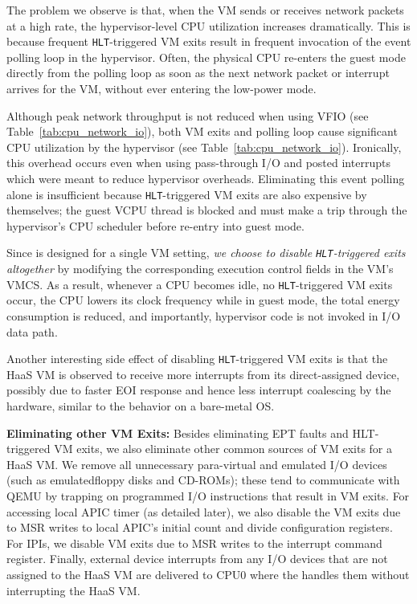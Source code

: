 The problem we observe is that, when the VM sends or receives network packets
at a high rate, the hypervisor-level CPU utilization increases
dramatically. This is because frequent {\tt HLT}-triggered VM exits
result in frequent invocation of the event polling loop in the hypervisor.
Often, the physical CPU re-enters the guest mode directly
from the polling loop as soon as the next network packet
or interrupt arrives for the VM, without ever entering the low-power mode.

Although peak network throughput is not reduced when
using VFIO (see Table~\ref{tab:cpu_network_io}),
both VM exits and polling loop cause significant
CPU utilization by the hypervisor
(see Table~\ref{tab:cpu_network_io}).
Ironically, this overhead occurs even when using pass-through I/O and
posted interrupts which were meant to reduce hypervisor overheads.
Eliminating this event polling alone is insufficient because {\tt HLT}-triggered VM exits
are also expensive by themselves; the guest VCPU thread is blocked and
must make a trip through the hypervisor's CPU scheduler before
re-entry into guest mode.

Since \na is designed for a single VM setting, {\em we choose to
disable {\tt HLT}-triggered exits altogether}
by modifying the corresponding execution control fields in the VM's VMCS.
As a result, whenever a CPU becomes idle, no {\tt HLT}-triggered
VM exits occur, the CPU lowers its clock frequency while in guest mode,
the total energy consumption is reduced, and importantly,
hypervisor code is not invoked in I/O data path.

Another interesting side effect of disabling {\tt HLT}-triggered VM exits
is that the HaaS VM is observed to receive more interrupts
from its direct-assigned device, possibly due to
faster EOI response and hence less interrupt coalescing by
the hardware, similar to the behavior on a bare-metal OS.

{\bf Eliminating other VM Exits:}
Besides eliminating EPT faults and HLT-triggered VM exits, we 
also eliminate other common sources of VM exits for a HaaS VM.
We remove all unnecessary para-virtual and emulated I/O devices 
(such as emulatedfloppy disks and CD-ROMs); these
tend to communicate with QEMU by trapping on programmed I/O instructions
that result in VM exits.
For accessing local APIC timer (as detailed later), 
we also disable the VM exits due to MSR
writes to local APIC's initial count and divide configuration
registers. For IPIs, we disable VM exits due to MSR writes to
the interrupt command register.  Finally, external device interrupts
from any I/O devices that are not assigned to the HaaS VM
are delivered to CPU0 where the \na handles them without
interrupting the HaaS VM.


